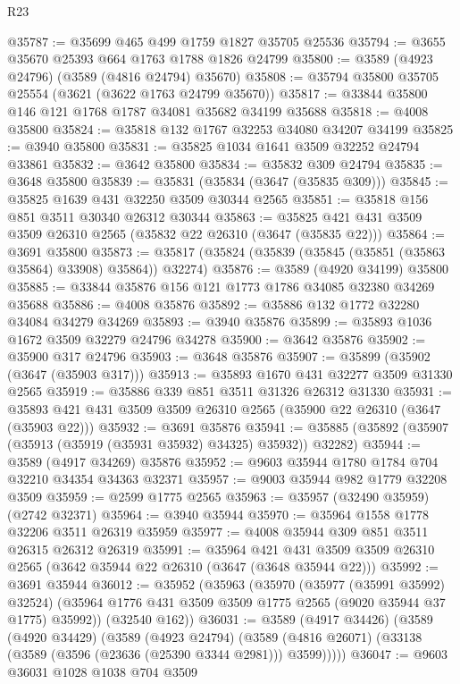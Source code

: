 \begin{lexlean}{R23}
\begin{coremodule}
@35787 := @35699 @465 @499 @1759 @1827 @35705 @25536
@35794 := @3655 @35670 @25393 @664 @1763 @1788 @1826 @24799
@35800 := @3589 (@4923 @24796) (@3589 (@4816 @24794) @35670)
@35808 := @35794 @35800 @35705 @25554 (@3621 (@3622 @1763 @24799 @35670))
@35817 := @33844 @35800 @146 @121 @1768 @1787 @34081 @35682 @34199 @35688
@35818 := @4008 @35800
@35824 := @35818 @132 @1767 @32253 @34080 @34207 @34199
@35825 := @3940 @35800
@35831 := @35825 @1034 @1641 @3509 @32252 @24794 @33861
@35832 := @3642 @35800
@35834 := @35832 @309 @24794
@35835 := @3648 @35800
@35839 := @35831 (@35834 (@3647 (@35835 @309)))
@35845 := @35825 @1639 @431 @32250 @3509 @30344 @2565
@35851 := @35818 @156 @851 @3511 @30340 @26312 @30344
@35863 := @35825 @421 @431 @3509 @3509 @26310 @2565 (@35832 @22 @26310 (@3647 (@35835 @22)))
@35864 := @3691 @35800
@35873 := @35817 (@35824 (@35839 (@35845 (@35851 (@35863 @35864) @33908) @35864)) @32274)
@35876 := @3589 (@4920 @34199) @35800
@35885 := @33844 @35876 @156 @121 @1773 @1786 @34085 @32380 @34269 @35688
@35886 := @4008 @35876
@35892 := @35886 @132 @1772 @32280 @34084 @34279 @34269
@35893 := @3940 @35876
@35899 := @35893 @1036 @1672 @3509 @32279 @24796 @34278
@35900 := @3642 @35876
@35902 := @35900 @317 @24796
@35903 := @3648 @35876
@35907 := @35899 (@35902 (@3647 (@35903 @317)))
@35913 := @35893 @1670 @431 @32277 @3509 @31330 @2565
@35919 := @35886 @339 @851 @3511 @31326 @26312 @31330
@35931 := @35893 @421 @431 @3509 @3509 @26310 @2565 (@35900 @22 @26310 (@3647 (@35903 @22)))
@35932 := @3691 @35876
@35941 := @35885 (@35892 (@35907 (@35913 (@35919 (@35931 @35932) @34325) @35932)) @32282)
@35944 := @3589 (@4917 @34269) @35876
@35952 := @9603 @35944 @1780 @1784 @704 @32210 @34354 @34363 @32371
@35957 := @9003 @35944 @982 @1779 @32208 @3509
@35959 := @2599 @1775 @2565
@35963 := @35957 (@32490 @35959) (@2742 @32371)
@35964 := @3940 @35944
@35970 := @35964 @1558 @1778 @32206 @3511 @26319 @35959
@35977 := @4008 @35944 @309 @851 @3511 @26315 @26312 @26319
@35991 := @35964
    @421
    @431
    @3509
    @3509
    @26310
    @2565
    (@3642 @35944 @22 @26310 (@3647 (@3648 @35944 @22)))
@35992 := @3691 @35944
@36012 := @35952
    (@35963
      (@35970
        (@35977 (@35991 @35992) @32524)
        (@35964 @1776 @431 @3509 @3509 @1775 @2565 (@9020 @35944 @37 @1775) @35992))
      (@32540 @162))
@36031 := @3589
    (@4917 @34426)
    (@3589
      (@4920 @34429)
      (@3589
        (@4923 @24794)
        (@3589 (@4816 @26071) (@33138 (@3589 (@3596 (@23636 (@25390 @3344 @2981))) @3599)))))
@36047 := @9603
    @36031
    @1028
    @1038
    @704
    @3509

\end{coremodule}
\end{lexlean}
